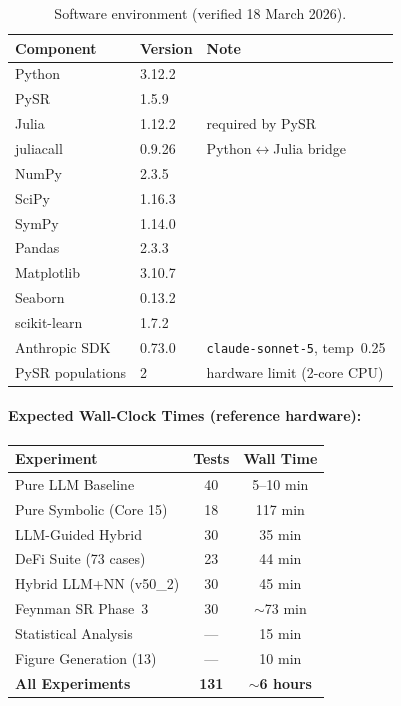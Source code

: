 \documentclass[twoside,11pt]{article}
\begin{document}
\begin{table}[H]
\centering
\caption{Software environment (verified 18 March 2026).}
\label{tab:runtime_reproducibility}
\small
\begin{tabular}{@{}lll@{}}
\toprule
\textbf{Component} & \textbf{Version} & \textbf{Note} \\
\midrule
Python       & 3.12.2  & \\
PySR         & 1.5.9   & \\
Julia        & 1.12.2  & required by PySR \\
juliacall    & 0.9.26  & Python$\leftrightarrow$Julia bridge \\
NumPy        & 2.3.5   & \\
SciPy        & 1.16.3  & \\
SymPy        & 1.14.0  & \\
Pandas       & 2.3.3   & \\
Matplotlib   & 3.10.7  & \\
Seaborn      & 0.13.2  & \\
scikit-learn & 1.7.2   & \\
Anthropic SDK & 0.73.0 & \texttt{claude-sonnet-5}, temp~0.25 \\
\midrule
PySR populations & 2 & hardware limit (2-core CPU) \\
\bottomrule
\end{tabular}
\end{table}

\paragraph{Expected Wall-Clock Times (reference hardware):}
\begin{small}
\begin{tabular}{@{}lcc@{}}
\toprule
\textbf{Experiment} & \textbf{Tests} & \textbf{Wall Time} \\
\midrule
Pure LLM Baseline          & 40  & 5--10 min \\
Pure Symbolic (Core 15)    & 18  & 117 min \\
LLM-Guided Hybrid          & 30  & 35 min \\
DeFi Suite (73 cases)      & 23  & 44 min \\
Hybrid LLM+NN (v50\_2)     & 30  & 45 min \\
Feynman SR Phase~3         & 30  & $\sim$73 min \\
Statistical Analysis       & --- & 15 min \\
Figure Generation (13)     & --- & 10 min \\
\midrule
\textbf{All Experiments}   & \textbf{131} & \textbf{$\sim$6 hours} \\
\bottomrule
\end{tabular}
\end{small}
\end{document}
